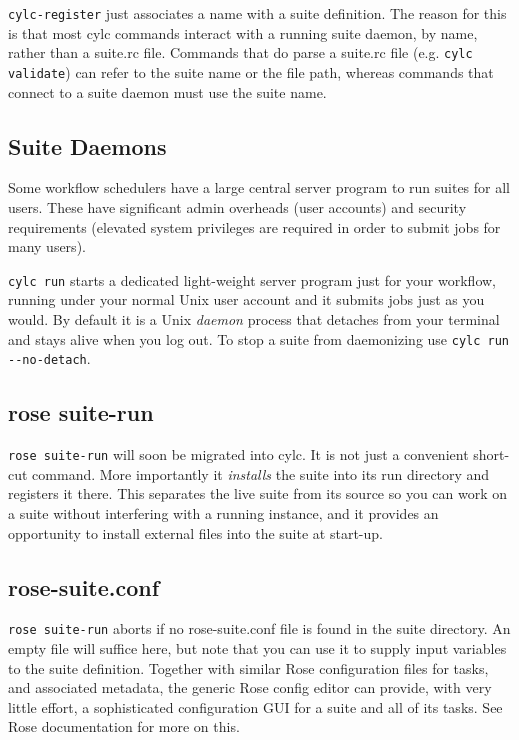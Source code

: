 \lstinline{cylc-register} just associates a name with a suite definition.  The
reason for this is that most cylc commands interact with a running suite
daemon, by name, rather than a suite.rc file.  Commands that do parse a
suite.rc file (e.g.  \lstinline=cylc validate=) can refer to the suite name or
the file path, whereas commands that connect to a suite daemon must use the
suite name.

\subsection{Suite Daemons}

Some workflow schedulers have a large central server program to run suites
for all users.  These have significant admin overheads (user accounts) and
security requirements (elevated system privileges are required in order to
submit jobs for many users).

\lstinline=cylc run= starts a dedicated light-weight server program just for your
workflow, running under your normal Unix user account and it submits jobs just
as you would. By default it is a Unix {\em daemon} process that detaches from
your terminal and stays alive when you log out. To stop a suite from
daemonizing use \lstinline=cylc run --no-detach=. 


\subsection{rose suite-run}

\lstinline{rose suite-run} will soon be migrated into cylc. It is not
just a convenient short-cut command. More importantly it {\em installs} the
suite into its run directory and registers it there.  This separates the
live suite from its source so you can work on a suite without interfering with
a running instance, and it provides an opportunity to install external
files into the suite at start-up.

\subsection{rose-suite.conf}

\lstinline=rose suite-run= aborts if no rose-suite.conf file is found in the
suite directory.  An empty file will suffice here, but note that you can use it
to supply input variables to the suite definition.  Together with similar
Rose configuration files for tasks, and associated metadata, the generic Rose
config editor can provide, with very little effort, a sophisticated
configuration GUI for a suite and all of its tasks.  See Rose documentation for
more on this.

